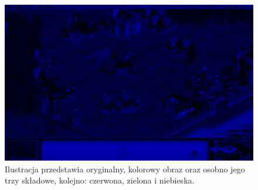 \begin{figure}[H]
\begin{center}
\includegraphics[scale=0.2]{imgs/blue.jpg}
\caption[Rozbicie obrazu kolorowego na RGB.]{\small{Ilustracja przedstawia oryginalny, kolorowy obraz oraz osobno jego trzy składowe, kolejno: czerwona, zielona i niebieska.}\footnotemark}
\label{rgb}
\end{center}
\end{figure}

